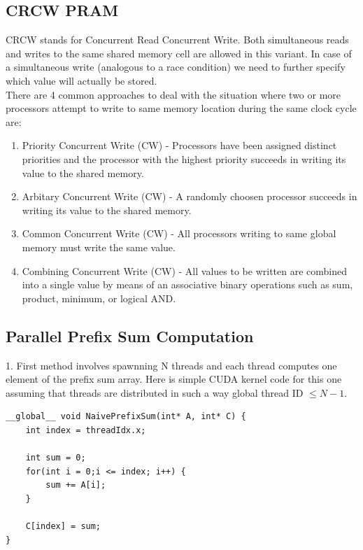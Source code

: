 \documentclass{article}
\begin{document}
\subsection*{CRCW PRAM}
CRCW stands for Concurrent Read Concurrent Write. Both simultaneous reads and writes to the same shared memory cell are allowed in this variant. In case of a simultaneous write (analogous to a race condition) we need to further specify which value will actually be stored. \\

There are 4 common approaches to deal with the situation where two or more processors attempt to write to same memory location during the same clock cycle are:
\begin{enumerate}
    \item Priority Concurrent Write (CW) - Processors have been assigned distinct priorities and the processor with the highest priority succeeds in writing its value to the shared memory.
    \item Arbitary Concurrent Write (CW) - A randomly choosen processor succeeds in writing its value to the shared memory.
    \item Common Concurrent Write (CW) - All processors writing to same global memory must write the same value.
    \item Combining Concurrent Write (CW) - All values to be written are combined into a single value by means of an associative binary operations such as sum, product, minimum, or logical AND.
\end{enumerate}

\subsection*{Parallel Prefix Sum Computation}
1. First method involves spawnning N threads and each thread computes one element of the prefix sum array. Here is simple CUDA kernel code for this one assuming that threads are distributed in such a way global thread ID $\leq N-1$.


\begin{lstlisting}
__global__ void NaivePrefixSum(int* A, int* C) {
    int index = threadIdx.x;

    int sum = 0;
    for(int i = 0;i <= index; i++) {
        sum += A[i];
    }

    C[index] = sum;
}
\end{lstlisting}
\end{document}
